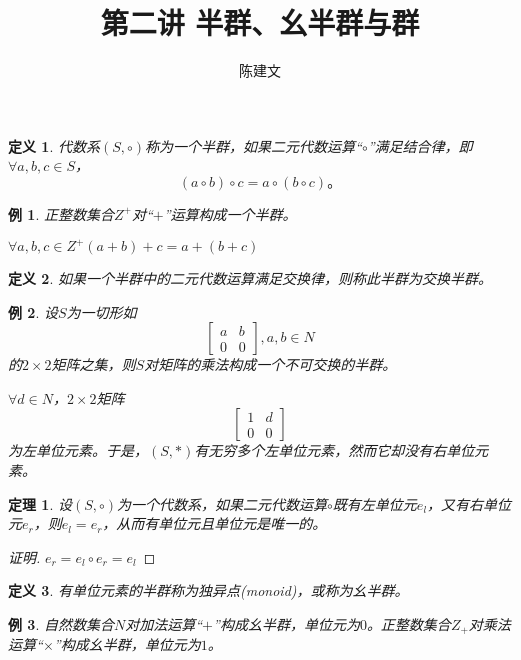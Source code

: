 \documentclass{article}
\newtheorem{Def}{定义}
\newtheorem{Thm}{定理}
\newtheorem*{Example}{例}
\begin{document}
\begin{CJK*}{UTF8}{gbsn}
  \title{第二讲 半群、幺半群与群}
  \author{陈建文}
  \maketitle
  


\begin{Def}
  代数系$(S,\circ)$称为一个半群，如果二元代数运算“$\circ$”满足结合律，即$\forall a,b,c \in S$，
  \[(a\circ b) \circ c = a \circ (b\circ c)\text{。}\] 
\end{Def}

\begin{Example}
  正整数集合$Z^+$对“$+$”运算构成一个半群。
\end{Example}

$\forall a,b,c \in Z^+ (a+b)+c = a + (b + c)$

\begin{Def}
  如果一个半群中的二元代数运算满足交换律，则称此半群为交换半群。
\end{Def}

\begin{Example}
  设$S$为一切形如
  \[\begin{bmatrix}
    a&b\\
    0&0
  \end{bmatrix},a,b\in N\]
的$2\times 2$矩阵之集，则$S$对矩阵的乘法构成一个不可交换的半群。

$\forall d\in N$，$2\times 2$矩阵
\[\begin{bmatrix}1&d\\0&0\end{bmatrix}\]
为左单位元素。于是，$(S,*)$有无穷多个左单位元素，然而它却没有右单位元素。
\end{Example}

\begin{Thm}
  设$(S,\circ)$为一个代数系，如果二元代数运算$\circ$既有左单位元$e_l$，又有右单位元$e_r$，则$e_l=e_r$，从而有单位元且单位元是唯一的。
\end{Thm}
\begin{proof}[证明]
  $e_r=e_l\circ e_r=e_l$
\end{proof}
\begin{Def}
  有单位元素的半群称为独异点(monoid)，或称为幺半群。
\end{Def}

\begin{Example}
  自然数集合$N$对加法运算“$+$”构成幺半群，单位元为$0$。正整数集合$Z_+$对乘法运算“$\times$”构成幺半群，单位元为$1$。
\end{Example}


\end{CJK*}
\end{document}
